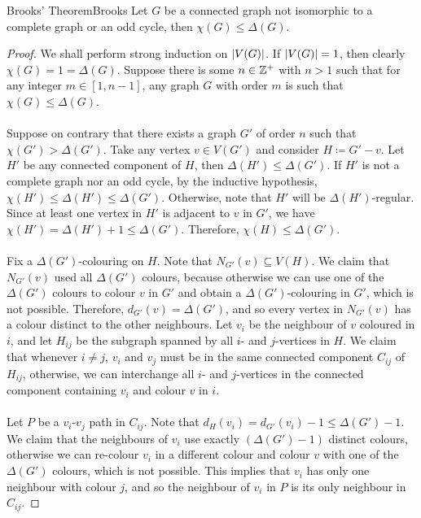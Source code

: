 \documentclass[math, code]{amznotes}
\theoremstyle{remark}
\begin{document}
\begin{thmbox}{Brooks' Theorem}{Brooks}
    Let $G$ be a connected graph not isomorphic to a complete graph or an odd cycle, then $\chi(G) \leq \Delta(G)$.
    \tcblower
    \begin{proof}
        We shall perform strong induction on ${\left\lvert {V(G)} \right\rvert}$. If ${\left\lvert {V(G)} \right\rvert} = 1$, then clearly $\chi(G) = 1 = \Delta(G)$. Suppose there is some $n \in \mathbb{Z}^+$ with $n > 1$ such that for any integer $m \in [1, n - 1]$, any graph $G$ with order $m$ is such that $\chi(G) \leq \Delta(G)$.
        \\\\
        Suppose on contrary that there exists a graph $G'$ of order $n$ such that $\chi(G') > \Delta(G')$. Take any vertex $v \in V(G')$ and consider $H \coloneqq G' - v$. Let $H'$ be any connected component of $H$, then $\Delta(H') \leq \Delta(G')$. If $H'$ is not a complete graph nor an odd cycle, by the inductive hypothesis, $\chi(H') \leq \Delta(H') \leq \Delta(G')$. Otherwise, note that $H'$ will be $\Delta(H')$-regular. Since at least one vertex in $H'$ is adjacent to $v$ in $G'$, we have $\chi(H') = \Delta(H') + 1 \leq \Delta(G')$. Therefore, $\chi(H) \leq \Delta(G')$.
        \\\\
        Fix a $\Delta(G')$-colouring on $H$. Note that $N_{G'}(v) \subseteq V(H)$. We claim that $N_{G'}(v)$ used all $\Delta(G')$ colours, because otherwise we can use one of the $\Delta(G')$ colours to colour $v$ in $G'$ and obtain a $\Delta(G')$-colouring in $G'$, which is not possible. Therefore, $d_{G'}(v) = \Delta(G')$, and so every vertex in $N_{G'}(v)$ has a colour distinct to the other neighbours. Let $v_i$ be the neighbour of $v$ coloured in $i$, and let $H_{ij}$ be the subgraph spanned by all $i$- and $j$-vertices in $H$. We claim that whenever $i \neq j$, $v_i$ and $v_j$ must be in the same connected component $C_{ij}$ of $H_{ij}$, otherwise, we can interchange all $i$- and $j$-vertices in the connected component containing $v_i$ and colour $v$ in $i$.
        \\\\
        Let $P$ be a $v_i$-$v_j$ path in $C_{ij}$. Note that $d_H(v_i) = d_{G'}(v_i) - 1 \leq \Delta(G') - 1$. We claim that the neighbours of $v_i$ use exactly $(\Delta(G') - 1)$ distinct colours, otherwise we can re-colour $v_i$ in a different colour and colour $v$ with one of the $\Delta(G')$ colours, which is not possible. This implies that $v_i$ has only one neighbour with colour $j$, and so the neighbour of $v_i$ in $P$ is its only neighbour in $C_{ij}$. 

\end{proof}
\end{thmbox}
\end{document}
